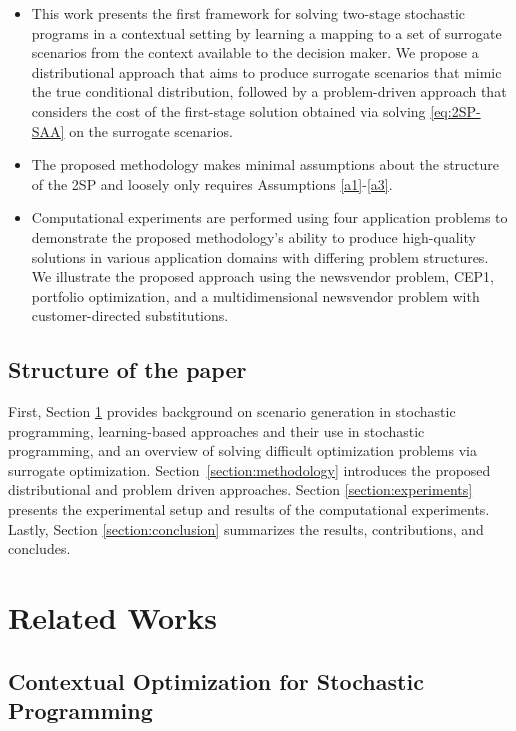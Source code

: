 \begin{itemize}
    \setlength\itemsep{-0.0em}
    \item This work presents the first framework for solving two-stage stochastic programs in a contextual setting by learning a mapping to a set of surrogate scenarios from the context available to the decision maker. We propose a distributional approach that aims to produce surrogate scenarios that mimic the true conditional distribution, followed by a problem-driven approach that considers the cost of the first-stage solution obtained via solving \ref{eq:2SP-SAA} on the surrogate scenarios.
     \item The proposed methodology makes minimal assumptions about the structure of the 2SP and loosely only requires Assumptions \ref{a1}-\ref{a3}.
 
    \item Computational experiments are performed using four application problems to demonstrate the proposed methodology's ability to produce high-quality solutions in various application domains with differing problem structures. We illustrate the proposed approach using the newsvendor problem, CEP1, portfolio optimization, and a multidimensional newsvendor problem with customer-directed substitutions. 
\end{itemize}



\subsection*{Structure of the paper}
First, Section \ref{section:Literature} provides background on scenario generation in stochastic programming, learning-based approaches and their use in stochastic programming, and an overview of solving difficult optimization problems via surrogate optimization. \hbox{Section \ref{section:methodology}} introduces the proposed distributional and problem driven approaches. Section \ref{section:experiments} presents the experimental setup and results of the computational experiments. Lastly, Section \ref{section:conclusion} summarizes the results, contributions, and concludes. 

\section{Related Works}\label{section:Literature}


\subsection{Contextual Optimization for Stochastic Programming}

